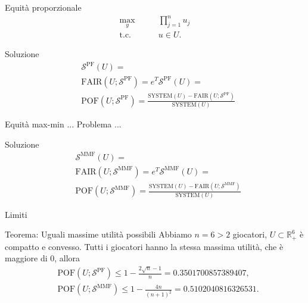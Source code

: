 \documentclass{beamer}
\begin{document}
\begin{frame}{Equità proporzionale}
	\begin{equation}
		\begin{split}
			\underset{y}{\text{max}} & \qquad \prod_{j=1}^n u_j \\
			\text{t.c.} & \qquad u \in U.
		\end{split}
	\end{equation}
	\begin{block}{Soluzione}
		\vspace{-0.4cm}
		\begin{equation}
			\begin{split}
				& \mathcal{S}^{\text{PF}}(U) = \\
				& \text{FAIR}(U;\mathcal{S}^{\text{PF}}) = e^T \mathcal{S}^{\text{PF}}(U) = \\
				& \text{POF}(U;\mathcal{S}^{\text{PF}}) = \frac{\text{SYSTEM}(U) - \text{FAIR}(U;\mathcal{S}^{\text{PF}})}{\text{SYSTEM}(U)}
			\end{split}
		\end{equation}
	\vspace{-0.2cm}
	\end{block}
\end{frame}

\begin{frame}{Equità max-min}
	... Problema ...
	\begin{block}{Soluzione}
		\vspace{-0.4cm}
		\begin{equation}
			\begin{split}
				& \mathcal{S}^{\text{MMF}}(U) = \\
				& \text{FAIR}(U;\mathcal{S}^{\text{MMF}}) = e^T \mathcal{S}^{\text{MMF}}(U) = \\
				& \text{POF}(U;\mathcal{S}^{\text{MMF}}) = \frac{\text{SYSTEM}(U) - \text{FAIR}(U;\mathcal{S}^{\text{MMF}})}{\text{SYSTEM}(U)}
			\end{split}
		\end{equation}
		\vspace{-0.2cm}
	\end{block}
\end{frame}

\begin{frame}{Limiti}
	\begin{block}{Teorema: Uguali massime utilità possibili}
		Abbiamo $ n = 6 > 2$ giocatori, $U \subset \mathbb{R}^6_+$ è compatto e convesso. Tutti i giocatori hanno la stessa massima utilità, che è maggiore di 0, allora
		\begin{equation}
			\begin{split}
				& \text{POF}(U;\mathcal{S}^{\text{PF}}) \le 1 - \frac{2\sqrt{n}-1}{n} = 0.3501700857389407, \\ 
				& \text{POF}(U;\mathcal{S}^{\text{MMF}}) \le 1 - \frac{4n}{(n+1)^2} = 0.5102040816326531. 
			\end{split}
		\end{equation}
	\end{block}
\end{frame}
\end{document}
